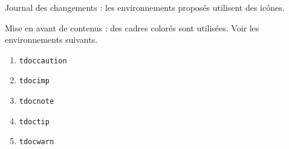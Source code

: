\documentclass[12pt, a4paper]{article}
\begin{document}
\begin{tdocnew}
    \item Journal des changements : les environnements proposés utilisent des icônes.


    \item Mise en avant de contenus : des cadres colorés sont utilisées. Voir les environnements suivants.
    \bgroup
    \setlength{\multicolsep}{3.0pt plus 1.0pt minus 0.75pt}
    \begin{multicols}{3}
        \begin{enumerate}
        	\item \verb#tdoccaution#
        	\item \verb#tdocimp#
        	\item \verb#tdocnote#
        	\item \verb#tdoctip#
        	\item \verb#tdocwarn#
        \end{enumerate}
    \end{multicols}
    \egroup
\end{tdocnew}
\end{document}
